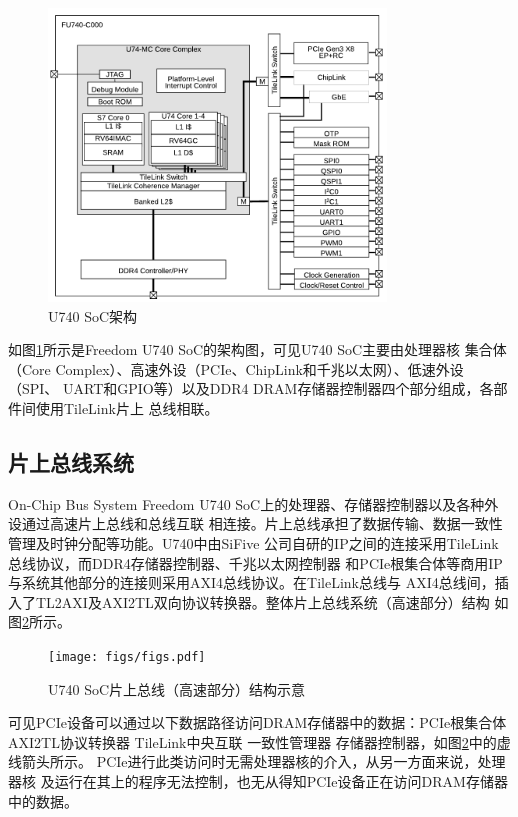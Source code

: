 \begin{figure}[ht]
	\centering
	\includegraphics[width=0.8\textwidth]{figs/u740.pdf}
	\caption{U740 SoC架构\cite{noauthor_hifive_nodate}}
	\label{fig:u740}
\end{figure}

如图\ref{fig:u740}所示是Freedom U740 SoC的架构图，可见U740 SoC主要由处理器核
集合体（Core Complex）、高速外设（PCIe、ChipLink和千兆以太网）、低速外设（SPI、
UART和GPIO等）以及DDR4 DRAM存储器控制器四个部分组成，各部件间使用TileLink片上
总线相联。

\subsection{片上总线系统}{On-Chip Bus System}
Freedom U740 SoC上的处理器、存储器控制器以及各种外设通过高速片上总线和总线互联
相连接。片上总线承担了数据传输、数据一致性管理及时钟分配等功能。U740中由SiFive
公司自研的IP之间的连接采用TileLink总线协议，而DDR4存储器控制器、千兆以太网控制器
和PCIe根集合体等商用IP与系统其他部分的连接则采用AXI4总线协议。在TileLink总线与
AXI4总线间，插入了TL2AXI及AXI2TL双向协议转换器。整体片上总线系统（高速部分）结构
如图\ref{fig:u740-bus}所示。

\begin{figure}[ht]
	\centering
	\texttt{[image: figs/figs.pdf]}
	\caption{U740 SoC片上总线（高速部分）结构示意}
	\label{fig:u740-bus}
\end{figure}

可见PCIe设备可以通过以下数据路径访问DRAM存储器中的数据：PCIe根集合体
\rightarrow AXI2TL协议转换器 \rightarrow TileLink中央互联 \rightarrow
一致性管理器 \rightarrow 存储器控制器，如图\ref{fig:u740-bus}中的虚线箭头所示。
PCIe进行此类访问时无需处理器核的介入，从另一方面来说，处理器核
及运行在其上的程序无法控制，也无从得知PCIe设备正在访问DRAM存储器中的数据。

